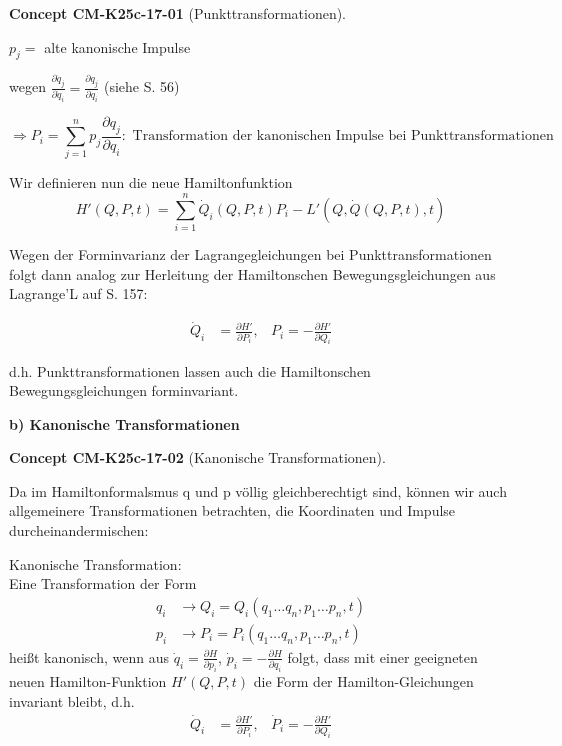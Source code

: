 \documentclass[10pt, letterpaper]{article}
\newcommand{\CustomHeading}[3]{%
  \par\medskip\noindent%
  \textbf{#1 #2} \textnormal{(#3)}.\enskip%
}
\newenvironment{CONC}[2]{\begin{unitbox}\CustomHeading{Concept}{#1}{#2}}{\end{unitbox}}
\begin{document}
\begin{CONC}{CM-K25c-17-01}{Punkttransformationen}
$p_j = $ alte kanonische Impulse

wegen $\frac{\partial \dot{q}_j}{\partial \dot{q}_i} = \frac{\partial q_j}{\partial q_i}$ (siehe S. 56)

\begin{equation*}
\Rightarrow P_i = \sum_{j=1}^n p_j \frac{\partial q_j}{\partial q_i} : \text{ Transformation der kanonischen Impulse bei Punkttransformationen}
\end{equation*}

Wir definieren nun die neue Hamiltonfunktion
\begin{equation*}
H'(Q,P,t) = \sum_{i=1}^n \dot{Q}_i(Q,P,t)P_i - L'(Q,\dot{Q}(Q,P,t),t)
\end{equation*}

Wegen der Forminvarianz der Lagrangegleichungen bei Punkttransformationen folgt dann analog zur Herleitung der Hamiltonschen Bewegungsgleichungen aus Lagrange'L auf S. 157:

\begin{align*}
\dot{Q}_i &= \frac{\partial H'}{\partial P_i}, & P_i = -\frac{\partial H'}{\partial Q_i}
\end{align*}

d.h. Punkttransformationen lassen auch die Hamiltonschen Bewegungsgleichungen forminvariant.
\end{CONC}





\textbf{b) Kanonische Transformationen}

\begin{CONC}{CM-K25c-17-02}{Kanonische Transformationen}
Da im Hamiltonformalsmus q und p völlig gleichberechtigt sind, können wir auch allgemeinere Transformationen betrachten, die Koordinaten und Impulse durcheinandermischen:


Kanonische Transformation:\\
Eine Transformation der Form
\begin{align*}
q_i &\to Q_i = Q_i(q_1 \ldots q_n, p_1 \ldots p_n, t)\\
p_i &\to P_i = P_i(q_1 \ldots q_n, p_1 \ldots p_n, t)
\end{align*}
heißt kanonisch, wenn aus $\dot{q}_i = \frac{\partial H}{\partial p_i}$, $\dot{p}_i = -\frac{\partial H}{\partial q_i}$ folgt, dass mit einer geeigneten neuen Hamilton-Funktion $H'(Q,P,t)$ die Form der Hamilton-Gleichungen invariant bleibt, d.h.
\begin{align*}
\dot{Q}_i &= \frac{\partial H'}{\partial P_i}, & \dot{P}_i = -\frac{\partial H'}{\partial Q_i}
\end{align*}
\end{CONC}
\end{document}
